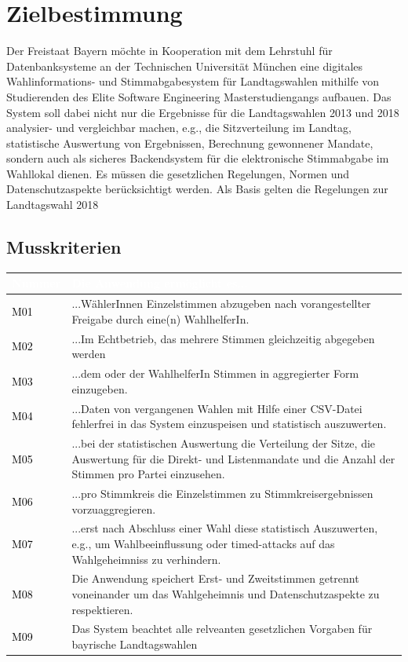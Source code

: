 \documentclass[a4paper,12pt]{article}
\newcommand\addrow[2]{\textcolor{black}{#1} &#2\\ \hline}
\newcommand\addheading[2]{\rowcolor{TUMBlue}\textcolor{white}{#1} & \textcolor{white}{#2}\\ \hline}
\newcommand\tabularhead{\begin{tabular}{|b|p{13cm}|}
\hline
}
\newenvironment{usecase}{\tabularhead}
{\hline\end{tabular}}
\begin{document}
 \setcounter{page}{2}

 \tableofcontents          %
 \clearpage
 
\section{Zielbestimmung}
Der Freistaat Bayern möchte in Kooperation mit dem Lehrstuhl für 
Datenbanksysteme an der Technischen Universität München eine digitales 
Wahlinformations- und Stimmabgabesystem für Landtagswahlen mithilfe von 
Studierenden des Elite Software Engineering Masterstudiengangs aufbauen.
%
Das System soll dabei nicht nur die Ergebnisse für die Landtagswahlen 
2013 und 2018 analysier- und vergleichbar machen, e.g., die Sitzverteilung 
im Landtag, statistische Auswertung von Ergebnissen, Berechnung gewonnener
Mandate, sondern auch als sicheres Backendsystem für die elektronische 
Stimmabgabe im Wahllokal dienen. 
%
Es müssen die gesetzlichen Regelungen, Normen und Datenschutzaspekte
berücksichtigt werden. Als Basis gelten die Regelungen zur
Landtagswahl 2018


\subsection{Musskriterien}
\begin{usecase}
	\addheading{Nummer}{Die Anwendung ermöglicht es...} 
      \addrow{M01}{...WählerInnen Einzelstimmen abzugeben nach vorangestellter Freigabe durch eine(n) WahlhelferIn.}
      \addrow{M02}{...Im Echtbetrieb, das mehrere Stimmen gleichzeitig abgegeben werden}
	\addrow{M03}{...dem oder der WahlhelferIn Stimmen in aggregierter Form einzugeben.}
	\addrow{M04}{...Daten von vergangenen Wahlen mit Hilfe einer CSV-Datei fehlerfrei in das System einzuspeisen und statistisch auszuwerten.}
	\addrow{M05}{...bei der statistischen Auswertung die Verteilung der Sitze, die Auswertung für die Direkt- und Listenmandate und die Anzahl der Stimmen pro Partei einzusehen.}
	\addrow{M06}{...pro Stimmkreis die Einzelstimmen zu Stimmkreisergebnissen vorzuaggregieren.}
	\addrow{M07}{...erst nach Abschluss einer Wahl diese statistisch Auszuwerten, e.g., um Wahlbeeinflussung oder timed-attacks auf das Wahlgeheimniss zu verhindern.}
	\addrow{M08}{Die Anwendung speichert Erst- und Zweitstimmen getrennt voneinander um das Wahlgeheimnis und Datenschutzaspekte zu respektieren.}
      \addrow{M09}{Das System beachtet alle relveanten gesetzlichen Vorgaben für bayrische Landtagswahlen}
\end{usecase}
\end{document}

